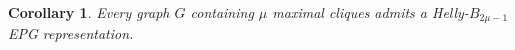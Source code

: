 \documentclass[
submission
]{dmtcs-episciences}
\newtheorem{lemma}[theorem]{Lemma}
\newtheorem{corollary}[theorem]{Corollary}
\begin{document}
 
 \begin{corollary}\label{cor:maxCliques}
 Every graph $G$ containing $\mu$ maximal cliques admits a Helly-$B_{2\mu -1}$ EPG representation. %
 \end{corollary}
 



\end{document}
